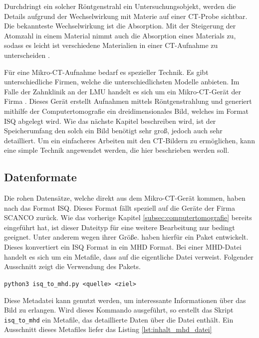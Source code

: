 Durchdringt ein solcher Röntgenstrahl ein Untersuchungsobjekt, werden die
Details aufgrund der Wechselwirkung mit Materie auf einer \ac{CT}-Probe sichtbar.
Die bekannteste Wechselwirkung ist die Absorption. Mit der Steigerung der Atomzahl
in einem Material nimmt auch die Absorption eines Materials zu, sodass es leicht
ist verschiedene Materialien in einer \ac{CT}-Aufnahme zu unterscheiden \citep[vgl.][K.~1]{nib2024}.

Für eine Mikro-\ac{CT}-Aufnahme bedarf es spezieller Technik. Es gibt
unterschiedliche Firmen, welche die unterschiedlichsten Modelle anbieten. Im
Falle der Zahnklinik an der \ac{LMU} handelt es sich um ein Mikro-\ac{CT}-Gerät
der Firma \citet{scanco2024}. Dieses Gerät erstellt Aufnahmen mittels
Röntgenstrahlung und generiert mithilfe der Computertomografie ein
dreidimensionales Bild, welches im Format \ac{ISQ} abgelegt wird. Wie das nächste
Kapitel beschreiben wird, ist der Speicherumfang den solch ein Bild benötigt
sehr groß, jedoch auch sehr detailliert. Um ein einfacheres Arbeiten mit den \ac{CT}-Bildern
zu ermöglichen, kann eine simple Technik angewendet werden, die hier beschrieben
werden soll.

\subsection{Datenformate}
\label{subsec:datensätze} Die rohen Datensätze, welche direkt aus dem Mikro-\ac{CT}-Gerät
kommen, haben nach \citet{scanco2024} das Format \ac{ISQ}. Dieses Format fällt speziell
auf die Geräte der Firma SCANCO zurück. Wie das vorherige Kapitel
\ref{subsec:computertomografie} bereits eingeführt hat, ist dieser Dateityp für eine
weitere Bearbeitung nur bedingt geeignet. Unter anderem wegen ihrer Größe. \citet[S.~118-119]{RoeschKunzelmann2018}
haben hierfür ein Paket entwickelt. Dieses konvertiert ein \ac{ISQ} Format in
ein \ac{MHD} Format. Bei einer \ac{MHD}-Datei handelt es sich um ein Metafile,
dass auf die eigentliche Datei verweist. Folgender Ausschnitt zeigt die Verwendung
des Pakets.
\begin{center}
	\texttt{python3 isq\_to\_mhd.py <quelle> <ziel>}
\end{center}
Diese Metadatei kann genutzt werden, um interessante Informationen über das Bild
zu erlangen. Wird dieses Kommando ausgeführt, so erstellt das Skript \texttt{isq\_to\_mhd}
ein Metafile, das detaillierte Daten über die Datei enthält. Ein Ausschnitt
dieses Metafiles liefer das Listing \ref{lst:inhalt_mhd_datei}

